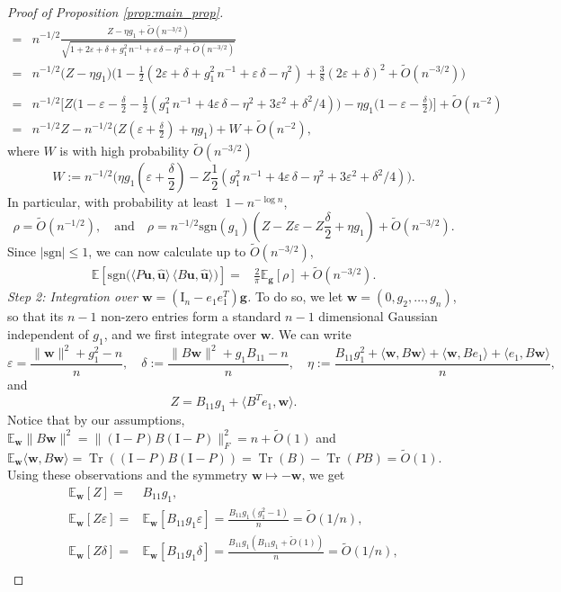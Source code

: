 \documentclass[10pt,a4paper]{amsart}
\newcommand\E{\mathbb{E}}
\newcommand\Tr{{\operatorname{Tr}}}
\newcommand\bg{\bm{g}}
\newcommand\bu{\bm{u}}
\newcommand\bw{\bm{w}}
\newcommand\eps{\varepsilon}
\newcommand\hu{\hat{\bm u}}
\newcommand\rem{\tilde{O}\left(n^{-3/2}\right)}
\begin{document}
\begin{proof}[Proof of Proposition \ref{prop:main_prop}]
\begin{align*}
= &    n^{-1/2}\frac{Z-\eta g_1+\rem}{\sqrt{1+2\eps+\delta+g_{1}^2\,n^{-1}+\eps\,\delta-\eta^2+\rem}}\\
= &    n^{-1/2}\big(Z-\eta g_1\big)\big(1-\frac{1}{2}(2\eps+\delta+g_{1}^2\,n^{-1}+\eps\,\delta-\eta^2)+\frac{3}{8}(2\eps+\delta)^2+\rem\big)\\
\\
= &    n^{-1/2}\big[Z\big(1-\eps-\frac{\delta}{2}-\frac{1}{2}(g_{1}^2\,n^{-1}+4\eps\,\delta-\eta^2+3\eps^2+\delta^{2}/4)\big)-\eta g_{1}\big(1-\eps-\frac{\delta}{2}\big)\big]+\tilde{O}(n^{-2})\\
= &    n^{-1/2}Z-n^{-1/2}\big(Z(\eps+\frac{\delta}{2})+\eta g_{1}\big)+W+\tilde{O}(n^{-2}),
\end{align*}
where $W$ is with high probability $\rem$
\[W:=n^{-1/2}\big(\eta g_1(\eps+\frac{\delta}{2})-Z\frac{1}{2}(g_{1}^2\,n^{-1}+4\eps\,\delta-\eta^2+3\eps^2+\delta^{2}/4)\big).\]
In particular, with probability at least  $\ 1-n^{-\log n}$,
\[\rho=\tilde{O}(n^{-1/2}),\quad\text{and} \quad\rho=n^{-1/2}\mathrm{sgn}(g_{1})\left(Z-Z\eps-Z\frac{\delta}{2}+\eta g_1\right)+\rem. \]
Since $|\mathrm{sgn}| \leq 1$, we can now calculate up to $\rem$,
\begin{align*}
    \E\!\left[\mathrm{sgn}\!\big(\langle P\bu,\hu\rangle\,
\langle B\bu,\hu\rangle\big)\right]
= & \frac{2}{\pi}\E_{\bg}[\rho]+\rem.
\end{align*}
\emph{Step 2: Integration over $\bw=(\mathrm{I}_{n}-e_{1}e_{1}^{T})\bg$.}
To do so, we let $\bw=(0,g_{2},\ldots,g_{n})$, so that its $n-1$ non-zero entries form a standard $n-1$ dimensional Gaussian independent of $g_1$, and we first integrate over $\bw$. We can write 
\[\eps=\frac{\|\bw\|^2+g_{1}^2-n}{n},\quad \delta:=\frac{\|B\bw\|^2+g_{1}B_{11}-n}{n},\quad \eta:=\frac{B_{11}g_{1}^2+\langle\bw,B\bw\rangle+\langle\bw,Be_{1}\rangle+\langle e_{1},B\bw\rangle}{n},\]
and
\[Z=B_{11}g_{1}+\langle B^{T}e_{1},\bw\rangle.\]
Notice that by our assumptions, $\E_{\bw}\|B\bw\|^2=\|(\mathrm{I}-P)B(\mathrm{I}-P)\|_{F}^2=n+\tilde{O}(1)$ and $\E_{\bw}\langle \bw,B\bw\rangle=\Tr((\mathrm{I}-P)B(\mathrm{I}-P))=\Tr(B)-\Tr(PB)=\tilde{O}(1)$. Using these observations and the symmetry $\bw\mapsto-\bw$, we get  
\begin{align*}
\E_{\bw}[Z]=& B_{11}g_{1},\\
\E_{\bw}[Z\eps]=& \E_{\bw}[B_{11}g_{1}\eps]=\frac{B_{11}g_{1}(g_{1}^2-1)}{n}=\tilde{O}(1/n),\\
\E_{\bw}[Z\delta]=& \E_{\bw}[B_{11}g_{1}\delta]=\frac{B_{11}g_{1}(B_{11}g_{1}+\tilde{O}(1))}{n}=\tilde{O}(1/n),\\

\end{align*}
\end{proof}
\end{document}
